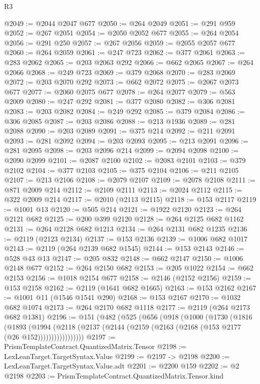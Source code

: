 \begin{lexlean}{R3}
\begin{coremodule}
@2049 := @2044 @2047 @677
@2050 := @264 @2049
@2051 := @291 @959
@2052 := @267 @2051
@2054 := @2050 @2052 @677
@2055 := @264 @2054
@2056 := @291 @250
@2057 := @267 @2056
@2059 := @2055 @2057 @677
@2060 := @264 @2059
@2061 := @247 @723
@2062 := @377 @2061
@2063 := @283 @2062
@2065 := @203 @2063 @292
@2066 := @662 @2065
@2067 := @264 @2066
@2068 := @249 @723
@2069 := @379 @2068
@2070 := @283 @2069
@2072 := @203 @2070 @292
@2073 := @662 @2072
@2075 := @2067 @2073 @677
@2077 := @2060 @2075 @677
@2078 := @264 @2077
@2079 := @563 @2009
@2080 := @247 @292
@2081 := @377 @2080
@2082 := @306 @2081
@2083 := @203 @2082
@2084 := @249 @292
@2085 := @379 @2084
@2086 := @306 @2085
@2087 := @203 @2086
@2088 := @213 @1936
@2089 := @281 @2088
@2090 := @203 @2089
@2091 := @375 @214
@2092 := @211 @2091
@2093 := @281 @2092
@2094 := @203 @2093
@2095 := @213 @2091
@2096 := @281 @2095
@2098 := @203 @2096 @214
@2099 := @2094 @2098
@2100 := @2090 @2099
@2101 := @2087 @2100
@2102 := @2083 @2101
@2103 := @379 @2102
@2104 := @377 @2103
@2105 := @375 @2104
@2106 := @211 @2105
@2107 := @213 @2106
@2108 := @2079 @2107
@2109 := @2078 @2108
@2111 := @871 @2009 @214
@2112 := @2109 @2111
@2113 := @2024 @2112
@2115 := @322 @2009 @214
@2117 := @2010 (@2113 @2115)
@2118 := @153 @2117
@2119 := @1001 @13
@2120 := @505 @214
@2121 := @1922 @2120
@2123 := @264 @2121 @682
@2125 := @200 @399 @2120
@2128 := @264 @2125 @682 @1162
@2131 := @264 @2128 @682 @1213
@2134 := @264 @2131 @682 @1235
@2136 := @2119 (@2123 @2134)
@2137 := @153 @2136
@2139 := @1006 @682 @1017
@2143 := @2119 (@264 @2139 @682 @1545)
@2144 := @153 @2143
@2146 := @528 @43 @13
@2147 := @205 @832
@2148 := @662 @2147
@2150 := @1006 @2148 @677
@2152 := @264 @2150 @682
@2153 := @205 @1022
@2154 := @662 @2153
@2156 := @1018 @2154 @677
@2158 := @2146 (@2152 @2156)
@2159 := @153 @2158
@2162 := @2119 (@1641 @682 @1665)
@2163 := @153 @2162
@2167 := @1001 @11 (@1546 @1541 @290)
@2168 := @153 @2167
@2170 := @1032 @682 @1074
@2173 := @264 @2170 @682 @1118
@2177 := @2119 (@264 @2173 @682 @1381)
@2196 := @151
    (@482
      (@525
        (@656
          (@918
            (@1000
              (@1730
                (@1816
                  (@1893
                    (@1994
                      (@2118
                        (@2137 (@2144 (@2159 (@2163 (@2168 (@153 @2177 (@26 @152)))))))))))))))))
@2197 := PrismTemplateContract.QuantizedMatrix.Tensor
@2198 := LexLeanTarget.TargetSyntax.Value
@2199 := @2197 -> @2198
@2200 := LexLeanTarget.TargetSyntax.Value.adt
@2201 := @2200 @159
@2202 := @2 @2198
@2203 := PrismTemplateContract.QuantizedMatrix.Tensor.kind

\end{coremodule}
\end{lexlean}
